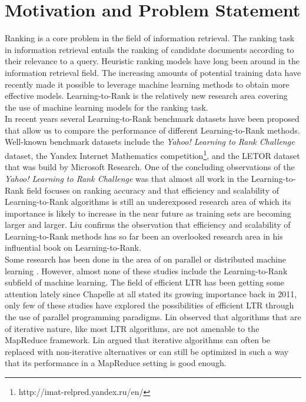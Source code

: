 \chapter{Motivation and Problem Statement}
Ranking is a core problem in the field of information retrieval. The ranking task in information retrieval entails the ranking of candidate documents according to their relevance to a query. Heuristic ranking models have long been around in the information retrieval field. The increasing amounts of potential training data have recently made it possible to leverage machine learning methods to obtain more effective models. Learning-to-Rank is the relatively new research area covering the use of machine learning models for the ranking task.\\

In recent years several Learning-to-Rank benchmark datasets have been proposed that allow us to compare the performance of different Learning-to-Rank methods. Well-known benchmark datasets include the \emph{Yahoo! Learning to Rank Challenge} dataset\cite{Chapelle2011a}, the Yandex Internet Mathematics competition\footnote{http://imat-relpred.yandex.ru/en/}, and the LETOR dataset\cite{Qin2010} that was build by Microsoft Research. One of the concluding observations of the \emph{Yahoo! Learning to Rank Challenge} was that almost all work in the Learning-to-Rank field focuses on ranking accuracy and that efficiency and scalability of Learning-to-Rank algorithms is still an underexposed research area of which its importance is likely to increase in the near future as training sets are becoming larger and larger\cite{Chapelle2011b}. Liu\cite{Liu2007} confirms the observation that efficiency and scalability of Learning-to-Rank methods has so far been an overlooked research area in his influential book on Learning-to-Rank.\\

Some research has been done in the area of on parallel or distributed machine learning \cite{Chu2007,Chang2007}. However, almost none of these studies include the Learning-to-Rank subfield of machine learning. The field of efficient LTR has been getting some attention lately \cite{Asadi2013a,Asadi2013b,Busa-Fekete2012,Sousa2012,Shukla2012} since Chapelle at all \cite{Chapelle2011b} stated its growing importance back in 2011, only few of these studies \cite{Sousa2012,Shukla2012} have explored the possibilities of efficient LTR through the use of parallel programming paradigms. Lin \cite{Lin2013} observed that algorithms that are of iterative nature, like most LTR algorithms, are not amenable to the MapReduce framework. Lin \cite{Lin2013} argued that iterative algorithms can often be replaced with non-iterative alternatives or can still be optimized in such a way that its performance in a MapReduce setting is good enough.\\

